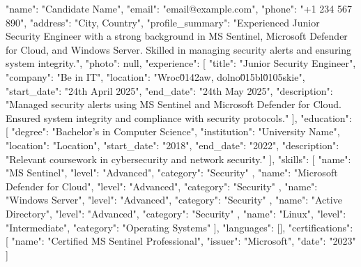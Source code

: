 {
  "name": "Candidate Name",
  "email": "email@example.com",
  "phone": "+1 234 567 890",
  "address": "City, Country",
  "profile_summary": "Experienced Junior Security Engineer with a strong background in MS Sentinel, Microsoft Defender for Cloud, and Windows Server. Skilled in managing security alerts and ensuring system integrity.",
  "photo": null,
  "experience": [
    {
      "title": "Junior Security Engineer",
      "company": "Be in IT",
      "location": "Wroc\u0142aw, dolno\u015bl\u0105skie",
      "start_date": "24th April 2025",
      "end_date": "24th May 2025",
      "description": "Managed security alerts using MS Sentinel and Microsoft Defender for Cloud. Ensured system integrity and compliance with security protocols."
    }
  ],
  "education": [
    {
      "degree": "Bachelor's in Computer Science",
      "institution": "University Name",
      "location": "Location",
      "start_date": "2018",
      "end_date": "2022",
      "description": "Relevant coursework in cybersecurity and network security."
    }
  ],
  "skills": [
    {
      "name": "MS Sentinel",
      "level": "Advanced",
      "category": "Security"
    },
    {
      "name": "Microsoft Defender for Cloud",
      "level": "Advanced",
      "category": "Security"
    },
    {
      "name": "Windows Server",
      "level": "Advanced",
      "category": "Security"
    },
    {
      "name": "Active Directory",
      "level": "Advanced",
      "category": "Security"
    },
    {
      "name": "Linux",
      "level": "Intermediate",
      "category": "Operating Systems"
    }
  ],
  "languages": [],
  "certifications": [
    {
      "name": "Certified MS Sentinel Professional",
      "issuer": "Microsoft",
      "date": "2023"
    }
  ]
}